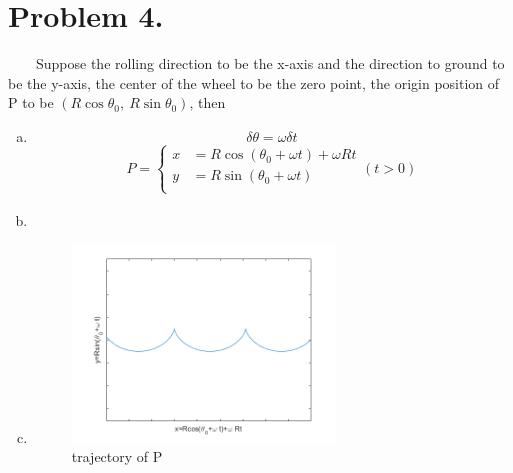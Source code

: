 \documentclass{article}
\begin{document}
\section*{Problem 4.}
	$\quad \quad$Suppose the rolling direction to be the x-axis and the direction to ground to be the y-axis, the center of the wheel to be the zero point, the origin position of P to be $(R\cos\theta_0,\ R\sin\theta_0)$, then
	\begin{enumerate}[(a)]
	\item
		$$\delta\theta=\omega\delta t$$
		\begin{eqnarray*}
			P=\left\{
			\begin{array}{lll}
				x&=R\cos (\theta_0+\omega t)+\omega Rt\\
				y&=R\sin (\theta_0+\omega t)\\
			\end{array}
			\right.(t>0)
		\end{eqnarray*}
	\item
		
	\item
		\begin{figure}[h!]
			\centering
			\includegraphics[width=7cm]{p4_b.png}
			\caption{trajectory of P}
			\label{fig-sample}
		\end{figure}
		

\end{enumerate}
\end{document}
